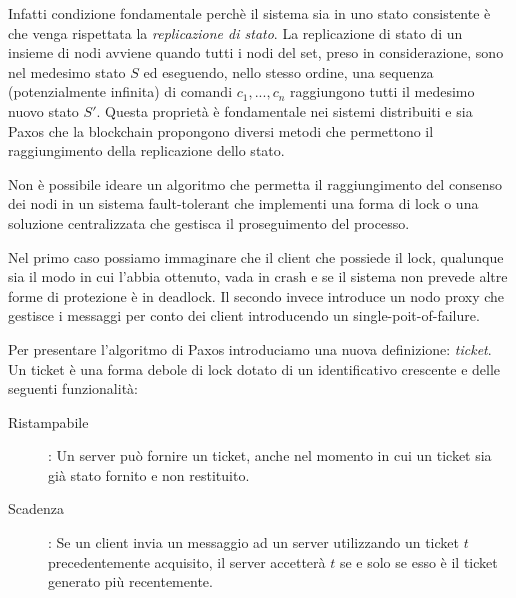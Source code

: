 	Infatti condizione fondamentale perchè il sistema sia in uno stato consistente è che venga rispettata la \textit{replicazione di stato}. La replicazione di stato di un insieme di nodi avviene quando tutti i nodi del set, preso in considerazione, sono nel medesimo stato $S$ ed eseguendo, nello stesso ordine, una sequenza (potenzialmente infinita) di comandi $c_1, ...,c_n$ raggiungono tutti il medesimo nuovo stato $S'$.
	Questa proprietà è fondamentale nei sistemi distribuiti e sia Paxos che la blockchain propongono diversi metodi che permettono il raggiungimento della replicazione dello stato.
	
	Non è possibile ideare un algoritmo che permetta il raggiungimento del consenso dei nodi in un sistema fault-tolerant che implementi una forma di lock o una soluzione centralizzata che gestisca il proseguimento del processo. 
	
	Nel primo caso possiamo immaginare che il client che possiede il lock, qualunque sia il modo in cui l'abbia ottenuto, vada in crash e se il sistema non prevede altre forme di protezione è in deadlock. Il secondo invece introduce un nodo proxy che gestisce i messaggi per conto dei client introducendo un single-poit-of-failure.
		
	\iffalse
	Visto che il problema è la sincronizzazione degli stati dei server aggiungiamo, come se fossimo in un'architettura master-slave, un nuovo nodo il Serializer che riceve la sequenza dei comandi e li inoltra uno alla volta ai server attendendo l'ack da essi e una volta ricevuti notifica l'ack del comando al client che ha fatto partire il comando.
	Qui introduciamo un singolo point-of-failure e un possibile approcio per distribuire le operazioni fatte dal serializer è quello di introdurre il locking o mutua esclusione dell'invio dei comandi.
	\fi
	
	Per presentare l'algoritmo di Paxos introduciamo una nuova definizione:
	\textit{ticket}.
	Un ticket è una forma debole di lock dotato di un identificativo crescente e delle seguenti funzionalità:
	\begin{description}
		\item[Ristampabile]: Un server può fornire un ticket, anche nel momento in cui un ticket sia già stato fornito e non restituito.
		\item[Scadenza]: Se un client invia un messaggio ad un server utilizzando un ticket $t$ precedentemente acquisito, il server accetterà $t$ se e solo se esso è il ticket generato più recentemente.
	\end{description}

